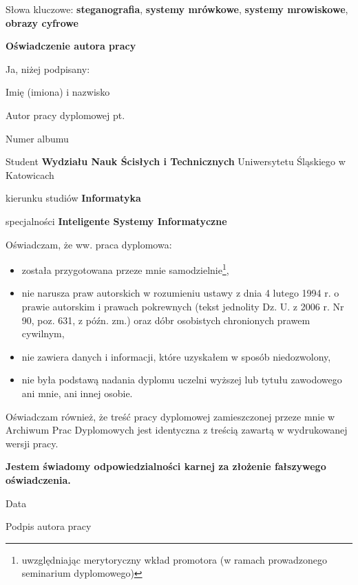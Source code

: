 \thispagestyle{empty}

\noindent Słowa kluczowe: \dotfill \textbf{steganografia}, \textbf{systemy mrówkowe}, \textbf{systemy mrowiskowe},
\textbf{obrazy cyfrowe} \dotfill

\vfill

\noindent \textbf{Oświadczenie autora pracy}
\vfill

\noindent Ja, niżej podpisany:

\begin{minipage}{0.9\textwidth}
{
%
	\vspace{0.5cm}
	Imię (imiona) i nazwisko \dotfill \textbf{\autor} \dotfill

	Autor pracy dyplomowej pt.  \textbf{\tytul} \dotfill

	Numer albumu \dotfill \textbf{\albumnum} \dotfill

	Student \dotfill \textbf{Wydziału Nauk Ścisłych i Technicznych} \dotfill Uniwersytetu Śląskiego w Katowicach

	kierunku studiów \dotfill \textbf{Informatyka} \dotfill

	specjalności \dotfill \textbf{Inteligente Systemy Informatyczne} \dotfill
%
}
\end{minipage}
\vspace{0.5cm}

\noindent Oświadczam, że ww. praca dyplomowa:
\begin{itemize}
	\setlength\itemsep{-0.25em}
	\setlength\baselineskip{4pt}
	\item została przygotowana przeze mnie samodzielnie\footnote{uwzględniając merytoryczny wkład promotora (w ramach prowadzonego seminarium dyplomowego)},
	\item nie narusza praw autorskich w rozumieniu ustawy z dnia 4 lutego 1994 r. o prawie autorskim i prawach
	pokrewnych (tekst jednolity Dz. U. z 2006 r. Nr 90, poz. 631, z późn. zm.) oraz dóbr osobistych chronionych
	prawem cywilnym,
	\item nie zawiera danych i informacji, które uzyskałem w sposób niedozwolony,
	\item nie była podstawą nadania dyplomu uczelni wyższej lub tytułu zawodowego ani mnie, ani innej osobie.
\end{itemize}

\noindent Oświadczam również, że treść pracy dyplomowej zamieszczonej przeze mnie w Archiwum Prac Dyplomowych jest
identyczna z treścią zawartą w wydrukowanej wersji pracy.

\vfill

\noindent \textbf{Jestem świadomy odpowiedzialności karnej za złożenie fałszywego oświadczenia.}

\vfill

\noindent
\mbox{}%
\hfill%
\begin{minipage}[c]{0.3\textwidth}
	\centering
	\makebox[0.9\textwidth]{\dotfill}
	\vfill\small{Data}\vfill
\end{minipage}%
\hfill%
\begin{minipage}[c]{0.3\textwidth}
	\centering
	\makebox[0.9\textwidth]{\dotfill}
	\dotfill
	\vfill\small{Podpis autora pracy}\vfill
\end{minipage}%
\hfill%
\mbox{}%
%
\vfill
